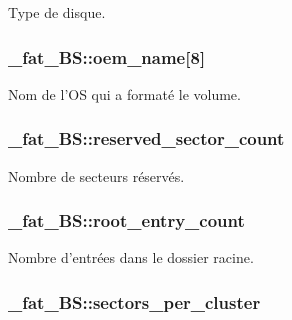 \-Type de disque. \hypertarget{struct__fat__BS_a6e3cafc7b7a76af3f3d82b322bda2903}{
\subsubsection[{oem\-\_\-name}]{ {\bf \-\_\-fat\-\_\-\-B\-S\-::oem\-\_\-name}\mbox{[}8\mbox{]}}}\label{struct__fat__BS_a6e3cafc7b7a76af3f3d82b322bda2903}
\-Nom de l'\-O\-S qui a formaté le volume. \hypertarget{struct__fat__BS_a7c4d28484980635def2bb6c1e6675b5a}{
\subsubsection[{reserved\-\_\-sector\-\_\-count}]{ {\bf \-\_\-fat\-\_\-\-B\-S\-::reserved\-\_\-sector\-\_\-count}}}\label{struct__fat__BS_a7c4d28484980635def2bb6c1e6675b5a}
\-Nombre de secteurs réservés. \hypertarget{struct__fat__BS_ae9265a2e00c0c3cbb4de257b602bcd2c}{
\subsubsection[{root\-\_\-entry\-\_\-count}]{ {\bf \-\_\-fat\-\_\-\-B\-S\-::root\-\_\-entry\-\_\-count}}}\label{struct__fat__BS_ae9265a2e00c0c3cbb4de257b602bcd2c}
\-Nombre d'entrées dans le dossier racine. \hypertarget{struct__fat__BS_ab26cacbe204fc157d8165af3ad86a33f}{
\subsubsection[{sectors\-\_\-per\-\_\-cluster}]{ {\bf \-\_\-fat\-\_\-\-B\-S\-::sectors\-\_\-per\-\_\-cluster}}}\label{struct__fat__BS_ab26cacbe204fc157d8165af3ad86a33f}
